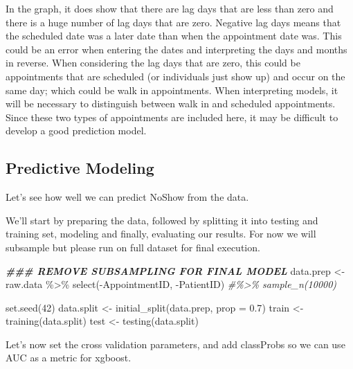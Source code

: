 \documentclass[
]{article}
\newenvironment{Shaded}{\begin{snugshade}}{\end{snugshade}}
\newcommand{\AttributeTok}[1]{\textcolor[rgb]{0.77,0.63,0.00}{#1}}
\newcommand{\CommentTok}[1]{\textcolor[rgb]{0.56,0.35,0.01}{\textit{#1}}}
\newcommand{\DecValTok}[1]{\textcolor[rgb]{0.00,0.00,0.81}{#1}}
\newcommand{\DocumentationTok}[1]{\textcolor[rgb]{0.56,0.35,0.01}{\textbf{\textit{#1}}}}
\newcommand{\FloatTok}[1]{\textcolor[rgb]{0.00,0.00,0.81}{#1}}
\newcommand{\FunctionTok}[1]{\textcolor[rgb]{0.00,0.00,0.00}{#1}}
\newcommand{\NormalTok}[1]{#1}
\newcommand{\OtherTok}[1]{\textcolor[rgb]{0.56,0.35,0.01}{#1}}
\newcommand{\SpecialCharTok}[1]{\textcolor[rgb]{0.00,0.00,0.00}{#1}}
\begin{document}
In the graph, it does show that there are lag days that are less than
zero and there is a huge number of lag days that are zero. Negative lag
days means that the scheduled date was a later date than when the
appointment date was. This could be an error when entering the dates and
interpreting the days and months in reverse. When considering the lag
days that are zero, this could be appointments that are scheduled (or
individuals just show up) and occur on the same day; which could be walk
in appointments. When interpreting models, it will be necessary to
distinguish between walk in and scheduled appointments. Since these two
types of appointments are included here, it may be difficult to develop
a good prediction model.

\hypertarget{predictive-modeling}{%
\subsection{Predictive Modeling}\label{predictive-modeling}}

Let's see how well we can predict NoShow from the data.

We'll start by preparing the data, followed by splitting it into testing
and training set, modeling and finally, evaluating our results. For now
we will subsample but please run on full dataset for final execution.

\begin{Shaded}
\begin{Highlighting}[]
\DocumentationTok{\#\#\# REMOVE SUBSAMPLING FOR FINAL MODEL}
\NormalTok{data.prep }\OtherTok{\textless{}{-}}\NormalTok{ raw.data }\SpecialCharTok{\%\textgreater{}\%} \FunctionTok{select}\NormalTok{(}\SpecialCharTok{{-}}\NormalTok{AppointmentID, }\SpecialCharTok{{-}}\NormalTok{PatientID) }\CommentTok{\#\%\textgreater{}\% sample\_n(10000)}

\FunctionTok{set.seed}\NormalTok{(}\DecValTok{42}\NormalTok{)}
\NormalTok{data.split }\OtherTok{\textless{}{-}} \FunctionTok{initial\_split}\NormalTok{(data.prep, }\AttributeTok{prop =} \FloatTok{0.7}\NormalTok{)}
\NormalTok{train  }\OtherTok{\textless{}{-}} \FunctionTok{training}\NormalTok{(data.split)}
\NormalTok{test }\OtherTok{\textless{}{-}} \FunctionTok{testing}\NormalTok{(data.split)}
\end{Highlighting}
\end{Shaded}

Let's now set the cross validation parameters, and add classProbs so we
can use AUC as a metric for xgboost.
\end{document}
